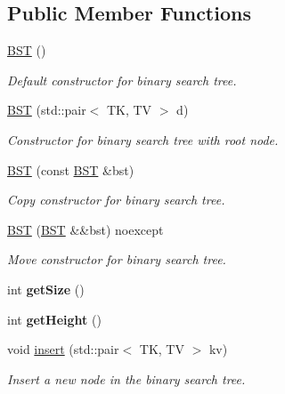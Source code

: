 \subsection*{Public Member Functions}
\begin{DoxyCompactItemize}
\item 
\mbox{\label{classBST_a60637cc47902581dc05696f825cb3286}} 
\hyperlink{classBST_a60637cc47902581dc05696f825cb3286}{B\+ST} ()
\begin{DoxyCompactList}\small\item\em Default constructor for binary search tree. \end{DoxyCompactList}\item 
\hyperlink{classBST_acb3f286124195e1f9967b6fb752f69f4}{B\+ST} (std\+::pair$<$ TK, TV $>$ d)
\begin{DoxyCompactList}\small\item\em Constructor for binary search tree with root node. \end{DoxyCompactList}\item 
\hyperlink{classBST_a2362c8e6d3746ed7480d5a920902a067}{B\+ST} (const \hyperlink{classBST}{B\+ST} \&bst)
\begin{DoxyCompactList}\small\item\em Copy constructor for binary search tree. \end{DoxyCompactList}\item 
\hyperlink{classBST_a291e3ac348c04e55fe432e4dc9ce05c9}{B\+ST} (\hyperlink{classBST}{B\+ST} \&\&bst) noexcept
\begin{DoxyCompactList}\small\item\em Move constructor for binary search tree. \end{DoxyCompactList}\item 
\mbox{\label{classBST_a9a57d3b378b474ec07fd0339b3aa8774}} 
int {\bfseries get\+Size} ()
\item 
\mbox{\label{classBST_a4638d6aec3a8fefc9ca124672b7c3def}} 
int {\bfseries get\+Height} ()
\item 
void \hyperlink{classBST_a21b2107c1e79e2d5fa9ca42952e62986}{insert} (std\+::pair$<$ TK, TV $>$ kv)
\begin{DoxyCompactList}\small\item\em Insert a new node in the binary search tree. \end{DoxyCompactList}\item 

\end{DoxyCompactItemize}
